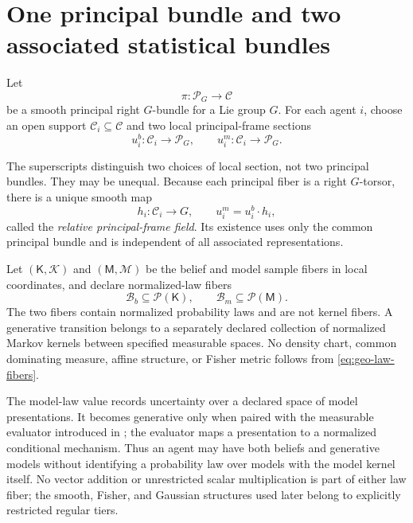 \section{One principal bundle and two associated statistical bundles}
\label{sec:geo-bundle}
\label{sec:geo-associated}

Let
\begin{equation}
\pi:\mathscr P_G\longrightarrow\mathcal C
\label{eq:geo-principal-bundle}
\end{equation}
be a smooth principal right $G$-bundle for a Lie group $G$.  For each agent $i$, choose an open
support $\mathcal C_i\subseteq\mathcal C$ and two local principal-frame sections
\begin{equation}
u_i^b:\mathcal C_i\longrightarrow\mathscr P_G,
\qquad
u_i^m:\mathcal C_i\longrightarrow\mathscr P_G.
\label{eq:geo-frame-sections}
\end{equation}

The superscripts distinguish two choices of local section, not two principal bundles.  They may
be unequal.  Because each principal fiber is a right $G$-torsor, there is a unique smooth map
\begin{equation}
h_i:\mathcal C_i\longrightarrow G,
\qquad
u_i^m=u_i^b\cdot h_i,
\label{eq:geo-relative-frame}
\end{equation}
called the \emph{relative principal-frame field}.  Its existence uses only the common principal
bundle and is independent of all associated representations. 

Let $(\mathsf K,\mathscr K)$ and $(\mathsf M,\mathscr M)$ be the belief and model sample fibers in
local coordinates, and declare normalized-law fibers
\begin{equation}
\mathcal B_b\subseteq\mathcal P(\mathsf K),
\qquad
\mathcal B_m\subseteq\mathcal P(\mathsf M).
\label{eq:geo-law-fibers}
\end{equation}
The two fibers contain normalized probability laws and are not kernel fibers.  A generative
transition belongs to a separately declared collection of normalized Markov kernels between
specified measurable spaces.  No density chart, common dominating measure, affine structure, or
Fisher metric follows from \eqref{eq:geo-law-fibers}.

The model-law value records uncertainty over a declared space of model presentations.
It becomes generative only when paired with the measurable evaluator introduced in
; the evaluator maps a presentation to a
normalized conditional mechanism.  Thus an agent may have both beliefs and generative
models without identifying a probability law over models with the model kernel itself.
No vector addition or unrestricted scalar multiplication is part of either law fiber;
the smooth, Fisher, and Gaussian structures used later belong to explicitly restricted
regular tiers.  

